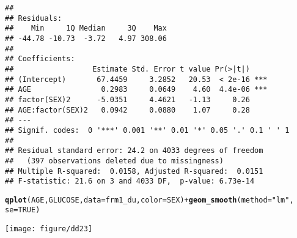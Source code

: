 \documentclass{article}\usepackage[]{graphicx}\usepackage[]{color}
\makeatletter
\def\maxwidth{ %
  \ifdim\Gin@nat@width>\linewidth
    \linewidth
  \else
    \Gin@nat@width
  \fi
}
\newcommand{\hlnum}[1]{\textcolor[rgb]{0.686,0.059,0.569}{#1}}%
\newcommand{\hlstr}[1]{\textcolor[rgb]{0.192,0.494,0.8}{#1}}%
\newcommand{\hlopt}[1]{\textcolor[rgb]{0,0,0}{#1}}%
\newcommand{\hlstd}[1]{\textcolor[rgb]{0.345,0.345,0.345}{#1}}%
\newcommand{\hlkwc}[1]{\textcolor[rgb]{0.333,0.667,0.333}{#1}}%
\newcommand{\hlkwd}[1]{\textcolor[rgb]{0.737,0.353,0.396}{\textbf{#1}}}%
\newenvironment{kframe}{%
 \def\at@end@of@kframe{}%
 \ifinner\ifhmode%
  \def\at@end@of@kframe{\end{minipage}}%
  \begin{minipage}{\columnwidth}%
 \fi\fi%
 \def\FrameCommand##1{\hskip\@totalleftmargin \hskip-\fboxsep
 \colorbox{shadecolor}{##1}\hskip-\fboxsep
     \hskip-\linewidth \hskip-\@totalleftmargin \hskip\columnwidth}%
 \MakeFramed {\advance\hsize-\width
   \@totalleftmargin\z@ \linewidth\hsize
   \@setminipage}}%
 {\par\unskip\endMakeFramed%
 \at@end@of@kframe}
\newenvironment{knitrout}{}{} %
\makeatother
\begin{document}
\begin{knitrout}
\begin{kframe}
\begin{verbatim}
## 
## Residuals:
##    Min     1Q Median     3Q    Max 
## -44.78 -10.73  -3.72   4.97 308.06 
## 
## Coefficients:
##                  Estimate Std. Error t value Pr(>|t|)    
## (Intercept)       67.4459     3.2852   20.53  < 2e-16 ***
## AGE                0.2983     0.0649    4.60  4.4e-06 ***
## factor(SEX)2      -5.0351     4.4621   -1.13     0.26    
## AGE:factor(SEX)2   0.0942     0.0880    1.07     0.28    
## ---
## Signif. codes:  0 '***' 0.001 '**' 0.01 '*' 0.05 '.' 0.1 ' ' 1
## 
## Residual standard error: 24.2 on 4033 degrees of freedom
##   (397 observations deleted due to missingness)
## Multiple R-squared:  0.0158,	Adjusted R-squared:  0.0151 
## F-statistic: 21.6 on 3 and 4033 DF,  p-value: 6.73e-14
\end{verbatim}
\begin{alltt}
\hlkwd{qplot}\hlstd{(AGE, GLUCOSE,} \hlkwc{data} \hlstd{= frm1_du,} \hlkwc{color} \hlstd{= SEX)} \hlopt{+} \hlkwd{geom_smooth}\hlstd{(}\hlkwc{method} \hlstd{=} \hlstr{"lm"}\hlstd{,}
    \hlkwc{se} \hlstd{=} \hlnum{TRUE}\hlstd{)}
\end{alltt}


{\ttfamily\noindent\color{warningcolor}{\#\# Warning: Removed 120 rows containing missing values (stat\_smooth).\\\#\# Warning: Removed 277 rows containing missing values (stat\_smooth).\\\#\# Warning: Removed 397 rows containing missing values (geom\_point).}}\end{kframe}
\texttt{[image: figure/dd23]} 

\end{knitrout}
\end{document}
